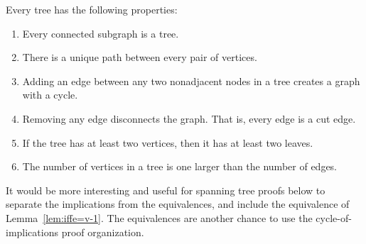 \begin{theorem}\label{th:treeprops}
Every tree has the following properties:

\begin{enumerate}
\item Every connected subgraph is a tree.\label{treeprops:asub}

\item There is a unique path between every pair of
  vertices.\label{treeprops:uniquepath}

\item Adding an edge between any two nonadjacent nodes in a tree creates a
  graph with a cycle.

\item Removing any edge disconnects the graph.  That is, every edge is
  a cut edge.

\item If the tree has at least two vertices, then it has at least two
  leaves.

\item\label{treeprops:v=e+1} The number of vertices in a tree is one
  larger than the number of edges.
\end{enumerate}

\end{theorem}

\begin{editingnotes}
It would be more interesting and useful for spanning tree proofs below
to separate the implications from the equivalences, and include the
equivalence of Lemma~\ref{lem:iffe=v-1}.  The equivalences are
another chance to use the cycle-of-implications proof organization.
\end{editingnotes}

